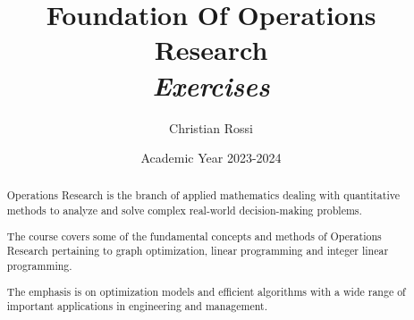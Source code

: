 \documentclass[12pt, a4paper]{report}
\title{Foundation Of Operations Research \\ \textit{Exercises}}
\author{Christian Rossi}
\date{Academic Year 2023-2024}
\newtheorem[style=M,bodystyle=\normalfont]{theorem}{Theorem}
\newtheorem[style=M,bodystyle=\normalfont]{corollary}{Corollary}
\newtheorem[style=M,bodystyle=\normalfont]{lemma}{Lemma}
\newtheorem[style=M,bodystyle=\normalfont]{definition}{Definition}
\begin{document}
\maketitle

\newpage

\begin{abstract}
    Operations Research is the branch of applied mathematics dealing with quantitative methods to analyze and solve
    complex real-world decision-making problems. 
    
    The course covers some of the fundamental concepts and methods of Operations Research pertaining to graph optimization, 
    linear programming and integer linear programming. 
    
    The emphasis is on optimization models and efficient algorithms with a wide range of important applications in 
    engineering and management.  
\end{abstract}

\newpage

\tableofcontents

\newpage


    
\end{document}
